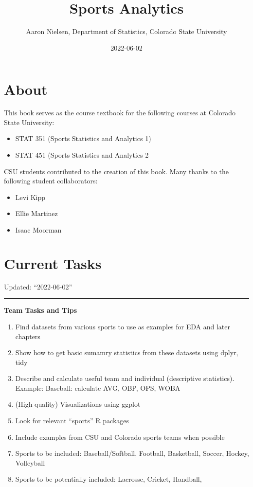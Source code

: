 \documentclass[
]{book}
\title{Sports Analytics}
\author{Aaron Nielsen, Department of Statistics, Colorado State University}
\date{2022-06-02}
\providecommand{\tightlist}{%
  \setlength{\itemsep}{0pt}\setlength{\parskip}{0pt}}
\theoremstyle{definition}
\theoremstyle{definition}
\theoremstyle{definition}
\theoremstyle{definition}
\theoremstyle{remark}
\begin{document}
\maketitle

{
\setcounter{tocdepth}{1}
\tableofcontents
}
\hypertarget{about}{%
\chapter*{About}\label{about}}

This book serves as the course textbook for the following courses at Colorado State University:

\begin{itemize}
\item
  STAT 351 (Sports Statistics and Analytics 1)
\item
  STAT 451 (Sports Statistics and Analytics 2
\end{itemize}

\hfill\break

CSU students contributed to the creation of this book. Many thanks to the following student collaborators:

\begin{itemize}
\item
  Levi Kipp
\item
  Ellie Martinez
\item
  Isaac Moorman
\end{itemize}

\hypertarget{current-tasks}{%
\chapter*{Current Tasks}\label{current-tasks}}

Updated: ``2022-06-02''

\begin{center}\rule{0.5\linewidth}{0.5pt}\end{center}

\textbf{Team Tasks and Tips}

\begin{enumerate}
\def\labelenumi{\arabic{enumi}.}
\tightlist
\item
  Find datasets from various sports to use as examples for EDA and later chapters
\item
  Show how to get basic sumamry statistics from these datasets using dplyr, tidy
\item
  Describe and calculate useful team and individual (descriptive statistics). Example: Baseball: calculate AVG, OBP, OPS, WOBA
\item
  (High quality) Visualizations using ggplot
\item
  Look for relevant ``sports'' R packages
\item
  Include examples from CSU and Colorado sports teams when possible
\item
  Sports to be included: Baseball/Softball, Football, Basketball, Soccer, Hockey, Volleyball
\item
  Sports to be potentially included: Lacrosse, Cricket, Handball,
\end{enumerate}
\end{document}
